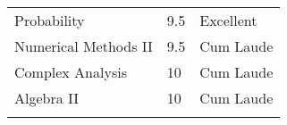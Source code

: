 \documentclass[10pt,a4paper,sans]{moderncv} %
\begin{document}
\begin{center}
\begin{tabular}{L{0.5\textwidth}C{0.2\textwidth}C{0.3\textwidth}}
    		Probability                                             & 9.5 & Excellent  \\
    		Numerical Methods II                                    & 9.5 & Cum Laude  \\
    		Complex Analysis                                        & 10  & Cum Laude  \\
    		Algebra II                                              & 10  & Cum Laude  \\
    		\bottomrule
    		\\
    	\end{tabular}
    \end{center}








\end{document}
